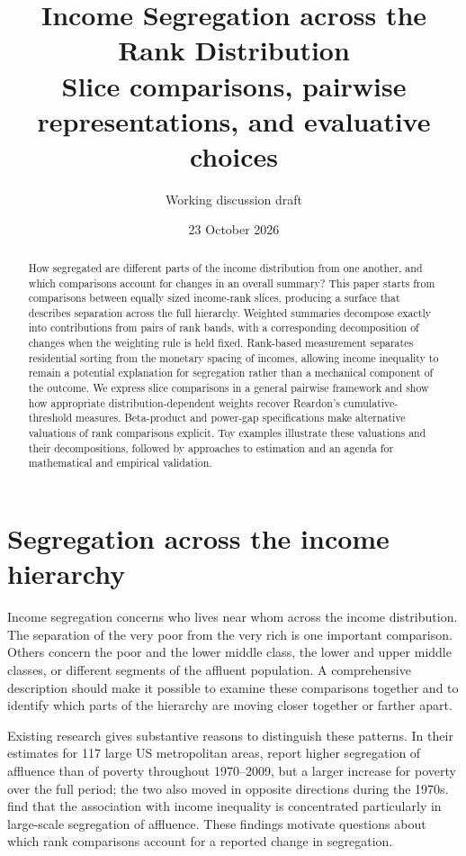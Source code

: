 \documentclass[11pt]{article}
\title{Income Segregation across the Rank Distribution\\
\large Slice comparisons, pairwise representations, and evaluative choices}
\author{Working discussion draft}
\date{23 October 2026}
\begin{document}
\maketitle
\begin{abstract}
How segregated are different parts of the income distribution from one another, and which comparisons account for changes in an overall summary? This paper starts from comparisons between equally sized income-rank slices, producing a surface that describes separation across the full hierarchy. Weighted summaries decompose exactly into contributions from pairs of rank bands, with a corresponding decomposition of changes when the weighting rule is held fixed. Rank-based measurement separates residential sorting from the monetary spacing of incomes, allowing income inequality to remain a potential explanation for segregation rather than a mechanical component of the outcome. We express slice comparisons in a general pairwise framework and show how appropriate distribution-dependent weights recover Reardon's cumulative-threshold measures. Beta-product and power-gap specifications make alternative valuations of rank comparisons explicit. Toy examples illustrate these valuations and their decompositions, followed by approaches to estimation and an agenda for mathematical and empirical validation.
\end{abstract}

\section{Segregation across the income hierarchy}

Income segregation concerns who lives near whom across the income distribution. The separation of the very poor from the very rich is one important comparison. Others concern the poor and the lower middle class, the lower and upper middle classes, or different segments of the affluent population. A comprehensive description should make it possible to examine these comparisons together and to identify which parts of the hierarchy are moving closer together or farther apart.

Existing research gives substantive reasons to distinguish these patterns. In their estimates for 117 large US metropolitan areas, \citet{bischoff2014} report higher segregation of affluence than of poverty throughout 1970--2009, but a larger increase for poverty over the full period; the two also moved in opposite directions during the 1970s. \citet{reardonbischoff2011} find that the association with income inequality is concentrated particularly in large-scale segregation of affluence. These findings motivate questions about which rank comparisons account for a reported change in segregation.
\end{document}
